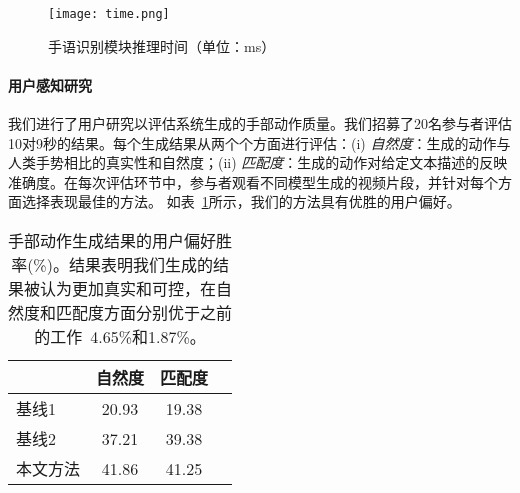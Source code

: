 \begin{figure}
  \centering
  \texttt{[image: time.png]}
  \caption{手语识别模块推理时间（单位：ms）}
  \label{fig:time}
\end{figure}


\paragraph{用户感知研究}
我们进行了用户研究以评估系统生成的手部动作质量。我们招募了20名参与者评估10对9秒的结果。每个生成结果从两个个方面进行评估：(i) \textit{自然度}：生成的动作与人类手势相比的真实性和自然度；(ii) \textit{匹配度}：生成的动作对给定文本描述的反映准确度。在每次评估环节中，参与者观看不同模型生成的视频片段，并针对每个方面选择表现最佳的方法。
如表~\ref{tab:perceptual_study}所示，我们的方法具有优胜的用户偏好。

\begin{table}[t]
    \centering
    \caption{手部动作生成结果的用户偏好胜率(\%)。结果表明我们生成的结果被认为更加真实和可控，在自然度和匹配度方面分别优于之前的工作~\cite{chen2024syntalker}4.65\%和1.87\%。}
    \small
    \label{tab:perceptual_study}
    \begin{tabular}{l ccc}
    \toprule
    & 自然度 & 匹配度 \\
    \midrule
    基线1~\cite{yang2024freetalker} & 20.93  & 19.38 \\
    基线2~\cite{chen2024syntalker} & 37.21  & 39.38 \\
    本文方法 & 41.86  & 41.25 \\
    \bottomrule
    \end{tabular}
\end{table}

    
    

